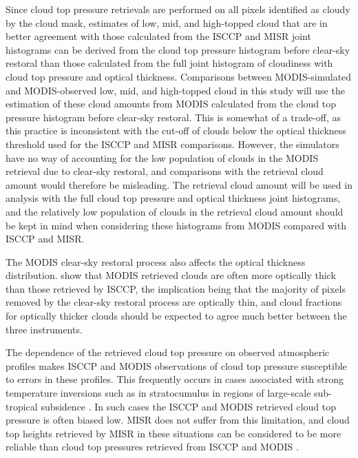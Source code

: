 Since cloud top pressure retrievals are performed on all pixels identified as cloudy by the cloud mask, estimates of low, mid, and high-topped cloud that are in better agreement with those calculated from the ISCCP and MISR joint histograms can be derived from the cloud top pressure histogram before clear-sky restoral than those calculated from the full joint histogram of cloudiness with cloud top pressure and optical thickness. Comparisons between MODIS-simulated and MODIS-observed low, mid, and high-topped cloud in this study will use the estimation of these cloud amounts from MODIS calculated from the cloud top pressure histogram before clear-sky restoral. This is somewhat of a trade-off, as this practice is inconsistent with the cut-off of clouds below the optical thickness threshold used for the ISCCP and MISR comparisons. However, the simulators have no way of accounting for the low population of clouds in the MODIS retrieval due to clear-sky restoral, and comparisons with the retrieval cloud amount would therefore be misleading. The retrieval cloud amount will be used in analysis with the full cloud top pressure and optical thickness joint histograms, and the relatively low population of clouds in the retrieval cloud amount should be kept in mind when considering these histograms from MODIS compared with ISCCP and MISR.

The MODIS clear-sky restoral process also affects the optical thickness distribution. \cite{pincus_et_al_2011} show that MODIS retrieved clouds are often more optically thick than those retrieved by ISCCP, the implication being that the majority of pixels removed by the clear-sky restoral process are optically thin, and cloud fractions for optically thicker clouds should be expected to agree much better between the three instruments.

The dependence of the retrieved cloud top pressure on observed atmospheric profiles makes ISCCP and MODIS observations of cloud top pressure susceptible to errors in these profiles. This frequently occurs in cases associated with strong temperature inversions such as in stratocumulus in regions of large-scale sub-tropical subsidence \citep{marchand_et_al_2010}. In such cases the ISCCP and MODIS retrieved cloud top pressure is often biased low. MISR does not suffer from this limitation, and cloud top heights retrieved by MISR in these situations can be considered to be more reliable than cloud top pressures retrieved from ISCCP and MODIS \citep{marchand_et_al_2010}.

